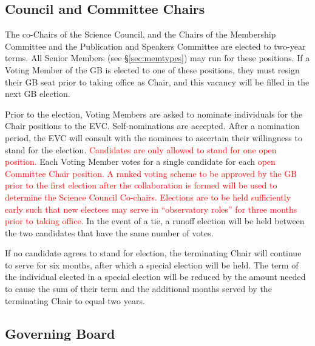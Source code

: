\documentclass[12pt]{article}
\begin{document}

\subsection{Council and Committee Chairs}
The co-Chairs of the Science Council, and the Chairs of the Membership Committee and the Publication and Speakers Committee are elected to two-year terms. All Senior Members (see \S\ref{sec:memtypes}) may  run for these positions.  If a Voting Member of the GB is elected to one of these positions, they must resign their GB seat prior to taking office as Chair, and this vacancy will be filled in the next GB election. 

Prior to the election, Voting Members are asked to nominate individuals for the Chair positions to the EVC.   Self-nominations are accepted.
After a nomination period, the EVC will consult with the nominees to ascertain their willingness to stand for the election. \textcolor{red}{Candidates are only allowed to stand for one open position.}
Each Voting Member votes for a single candidate for each  \textcolor{red}{open Committee  Chair position. A ranked voting scheme to be approved by the GB prior to the first election after the collaboration is formed will be used to determine the Science Council Co-chairs. Elections are to be held sufficiently early such that new electees may serve in ``observatory roles'' for three months prior to taking office.}
In the event of a tie, a runoff election will be held between the two candidates that have the same number of votes. 

If no candidate agrees to stand for election, the terminating Chair will continue to serve for six months, after which a special election will be held. The term of the individual elected in a special election will be reduced by the amount needed to cause the sum of their term and the additional months served by the terminating Chair to equal two years.


\subsection{Governing Board}
\label{sec:gb-elections}
\end{document}
